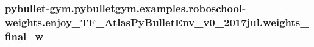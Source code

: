 \subsubsection[{\texorpdfstring{weights\+\_\+final\+\_\+w}{weights_final_w}}]{\setlength{\rightskip}{0pt plus 5cm}pybullet-\/gym.\+pybulletgym.\+examples.\+roboschool-\/weights.\+enjoy\+\_\+\+T\+F\+\_\+\+Atlas\+Py\+Bullet\+Env\+\_\+v0\+\_\+2017jul.\+weights\+\_\+final\+\_\+w}\hypertarget{namespacepybullet-gym_1_1pybulletgym_1_1examples_1_1roboschool-weights_1_1enjoy___t_f___atlas_py_bullet_env__v0__2017jul_a65d82cb5d7061f7a4d6ccb82554fa099}{}\label{namespacepybullet-gym_1_1pybulletgym_1_1examples_1_1roboschool-weights_1_1enjoy___t_f___atlas_py_bullet_env__v0__2017jul_a65d82cb5d7061f7a4d6ccb82554fa099}
